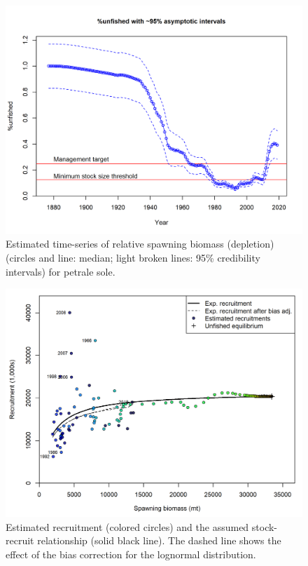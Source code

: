 \documentclass[12pt,]{article}
\begin{document}
\FloatBarrier

\begin{figure}
\centering
\includegraphics{r4ss/plots_mod1/ts9_unfished_with_95_asymptotic_intervals_intervals.png}
\caption{Estimated time-series of relative spawning biomass (depletion)
(circles and line: median; light broken lines: 95\% credibility
intervals) for petrale sole. \label{fig:depl}}
\end{figure}

\FloatBarrier

\begin{figure}
\centering
\includegraphics{r4ss/plots_mod1/SR_curve2.png}
\caption{Estimated recruitment (colored circles) and the assumed
stock-recruit relationship (solid black line). The dashed line shows the
effect of the bias correction for the lognormal distribution.
\label{fig:stock_recruit_curve}}
\end{figure}
\end{document}
